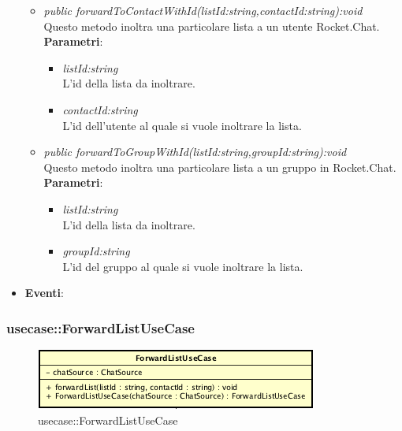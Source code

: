 \begin{itemize}
\begin{itemize}
	\item \textit{public forwardToContactWithId(listId:string,contactId:string):void}\\
	Questo metodo inoltra una particolare lista a un utente Rocket.Chat.
			\\ \textbf{Parametri}: \begin{itemize}
			\item \textit{listId:string}\\
			L'id della lista da inoltrare.
			\item \textit{contactId:string}\\
			L'id dell'utente al quale si vuole inoltrare la lista.
			\end{itemize} 
	\item \textit{public forwardToGroupWithId(listId:string,groupId:string):void}\\
	Questo metodo inoltra una particolare lista a un gruppo in Rocket.Chat.
			\\ \textbf{Parametri}: \begin{itemize}
			\item \textit{listId:string}\\
			L'id della lista da inoltrare.
			\item \textit{groupId:string}\\
			L'id del gruppo al quale si vuole inoltrare la lista.
			\end{itemize} 
	\end{itemize}
\item \textbf{Eventi}:
\end{itemize}

\subsubsection{usecase::ForwardListUseCase}

\label{usecase::ForwardListUseCase}
\begin{figure}[ht]
	\centering
	\includegraphics[scale=0.5]{Sezioni/SottosezioniST/img/app/ForwardListUseCase.png}
	\caption{usecase::ForwardListUseCase}
\end{figure}

